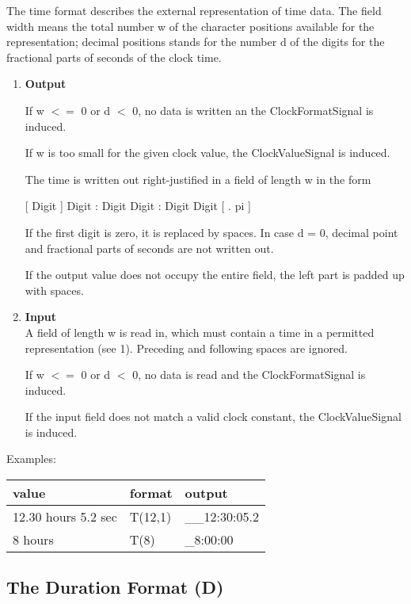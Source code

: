 The time format describes the external representation of time data. The
field width means the total number w of the character positions
available for the representation; decimal positions stands for the
number d of the digits for the fractional parts of seconds of the clock
time.
\begin{enumerate}
\item {\bf Output}\\
\begin{accepted}
If w $<=$ 0 or d $<$ 0, no data is written an the ClockFormatSignal
   is induced.

If w is too small for the given clock value, the ClockValueSignal
   is induced.
\end{accepted}

The time is written out right-justified in a field of length w in the
form

[ Digit ] Digit : Digit Digit : Digit Digit [ . pi ]

If the first digit is zero, it is replaced by spaces. In case d = 0,
decimal point and fractional parts of seconds are not written out.

If the output value does not occupy the entire field, the left part is
padded up with spaces.
\item {\bf Input}\\
A field of length w is read in, which must contain a time in a permitted
representation (see 1). Preceding and following spaces are ignored.

\begin{accepted}
If w $<=$ 0 or d $<$ 0, no data is read and the ClockFormatSignal
   is induced.

If the input field does not match a valid clock constant, the 
   ClockValueSignal is induced.
\end{accepted}
\end{enumerate}

Examples:

\begin{tabular}{lll}
value               & format  & output \\ \hline
12.30 hours 5.2 sec & T(12,1) & \_\_12:30:05.2 \\
8 hours             & T(8)    & \_8:00:00
\end{tabular}

\subsection{The Duration Format (D)}   %
\label{sec_dation_d_format}

